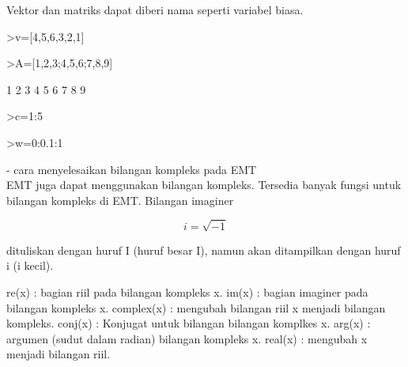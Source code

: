 \documentclass[a4paper,10pt]{article}
\begin{document}
\begin{eulernotebook}
\begin{eulercomment}
\begin{eulercomment}
\begin{eulercomment}
Vektor dan matriks dapat diberi nama seperti variabel biasa.
\end{eulercomment}
\begin{eulerprompt}
>v=[4,5,6,3,2,1]
\end{eulerprompt}
\begin{euleroutput}
  [4,  5,  6,  3,  2,  1]
\end{euleroutput}
\begin{eulerprompt}
>A=[1,2,3;4,5,6;7,8,9]
\end{eulerprompt}
\begin{euleroutput}
              1             2             3 
              4             5             6 
              7             8             9 
\end{euleroutput}
\begin{eulerprompt}
>c=1:5
\end{eulerprompt}
\begin{euleroutput}
  [1,  2,  3,  4,  5]
\end{euleroutput}
\begin{eulerprompt}
>w=0:0.1:1
\end{eulerprompt}
\begin{euleroutput}
  [0,  0.1,  0.2,  0.3,  0.4,  0.5,  0.6,  0.7,  0.8,  0.9,  1]
\end{euleroutput}
\begin{eulercomment}
- cara menyelesaikan bilangan kompleks pada EMT\\
EMT juga dapat menggunakan bilangan kompleks. Tersedia banyak fungsi
untuk bilangan kompleks di EMT. Bilangan imaginer

\end{eulercomment}
\begin{eulerformula}
\[
i = \sqrt{-1}
\]
\end{eulerformula}
\begin{eulercomment}
dituliskan dengan huruf I (huruf besar I), namun akan ditampilkan
dengan huruf i (i kecil).

\end{eulercomment}
\begin{eulerttcomment}
  re(x) : bagian riil pada bilangan kompleks x.
  im(x) : bagian imaginer pada bilangan kompleks x.
  complex(x) : mengubah bilangan riil x menjadi bilangan kompleks.
  conj(x) : Konjugat untuk bilangan bilangan komplkes x.
  arg(x) : argumen (sudut dalam radian) bilangan kompleks x.
  real(x) : mengubah x menjadi bilangan riil.
\end{eulerttcomment}
\begin{eulercomment}


\end{eulercomment}
\end{eulercomment}
\end{eulercomment}
\end{eulernotebook}
\end{document}
